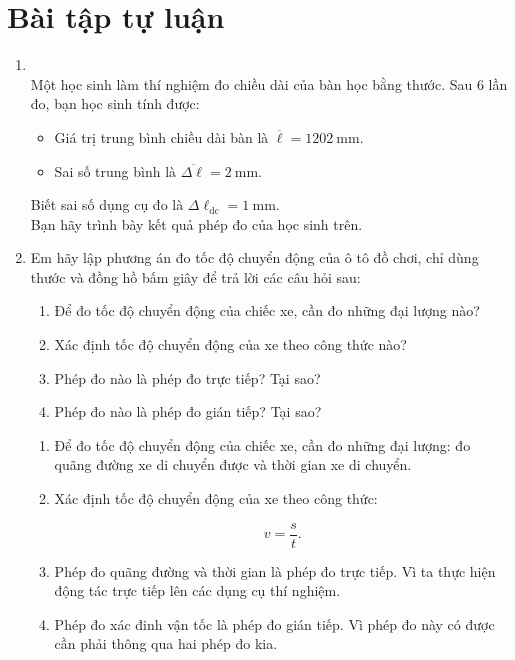 \section{Bài tập tự luận}
\begin{enumerate}[label=\bfseries Bài \arabic*:,leftmargin=1.5cm]
	\item 
	\\
	Một học sinh làm thí nghiệm đo chiều dài của bàn học bằng thước. Sau 6 lần đo, bạn học sinh tính được:
	\begin{itemize}
		\item Giá trị trung bình chiều dài bàn là $\overline{\ell}=\SI{1202}{\milli\meter}$.
		\item Sai số trung bình là $\overline{\Delta\ell}=\SI{2}{\milli\meter}$.
	\end{itemize}
Biết sai số dụng cụ đo là $\Delta \ell_\text{dc}=\SI{1}{\milli\meter}$.\\
Bạn hãy trình bày kết quả phép đo của học sinh trên.
	\item {}
	
	
	{
		Em hãy lập phương án đo tốc độ chuyển động của ô tô đồ chơi, chỉ dùng thước và đồng hồ bấm giây để trả lời các câu hỏi sau:
		\begin{enumerate}[label=\alph*)]
			\item Để đo tốc độ chuyển động của chiếc xe, cần đo những đại lượng nào?
			\item Xác định tốc độ chuyển động của xe theo công thức nào?
			\item Phép đo nào là phép đo trực tiếp? Tại sao?
			\item Phép đo nào là phép đo gián tiếp? Tại sao?
		\end{enumerate}
		
	}
	
	\hideall
	{	
		\begin{enumerate}[label=\alph*)]
			\item Để đo tốc độ chuyển động của chiếc xe, cần đo những đại lượng: đo quãng đường xe di chuyển được và thời gian xe di chuyển.
			\item Xác định tốc độ chuyển động của xe theo công thức:
			
			$$v = \dfrac{s}{t}.$$
			
			\item Phép đo quãng đường và thời gian là phép đo trực tiếp. Vì ta thực hiện động tác trực tiếp lên các dụng cụ thí nghiệm.
			\item Phép đo xác đinh vận tốc là phép đo gián tiếp. Vì phép đo này có được cần phải thông qua hai phép đo kia.
		\end{enumerate}
	}


\end{enumerate}
